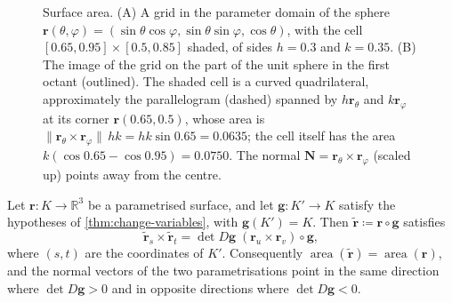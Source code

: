 \begin{figure}
{}
\caption{Surface area. (A) A grid in the parameter domain of the sphere $\mathbf r(\theta,\varphi)=(\sin\theta\cos\varphi,\sin\theta\sin\varphi,\cos\theta)$, with the cell $[0.65,0.95]\times[0.5,0.85]$ shaded, of sides $h=0.3$ and $k=0.35$. (B) The image of the grid on the part of the unit sphere in the first octant (outlined). The shaded cell is a curved quadrilateral, approximately the parallelogram (dashed) spanned by $h\mathbf r_\theta$ and $k\mathbf r_\varphi$ at its corner $\mathbf r(0.65,0.5)$, whose area is $\|\mathbf r_\theta\times\mathbf r_\varphi\|\,hk=hk\sin0.65=0.0635$; the cell itself has the area $k(\cos0.65-\cos0.95)=0.0750$. The normal $\mathbf N=\mathbf r_\theta\times\mathbf r_\varphi$ (scaled up) points away from the centre.}
\label{fig:surface-patch}
\end{figure}

\begin{proposition}
\label{prop:surface-reparam}
Let $\mathbf r\colon K\to\mathbb R^3$ be a parametrised surface, and let $\mathbf g\colon K'\to K$ satisfy the hypotheses of \cref{thm:change-variables}, with $\mathbf g(K')=K$. Then $\tilde{\mathbf r}\coloneqq\mathbf r\circ\mathbf g$ satisfies
\[
\tilde{\mathbf r}_s\times\tilde{\mathbf r}_t=\det D\mathbf g\;(\mathbf r_u\times\mathbf r_v)\circ\mathbf g ,
\]
where $(s,t)$ are the coordinates of $K'$. Consequently $\operatorname{area}(\tilde{\mathbf r})=\operatorname{area}(\mathbf r)$, and the normal vectors of the two parametrisations point in the same direction where $\det D\mathbf g>0$ and in opposite directions where $\det D\mathbf g<0$.
\end{proposition}

